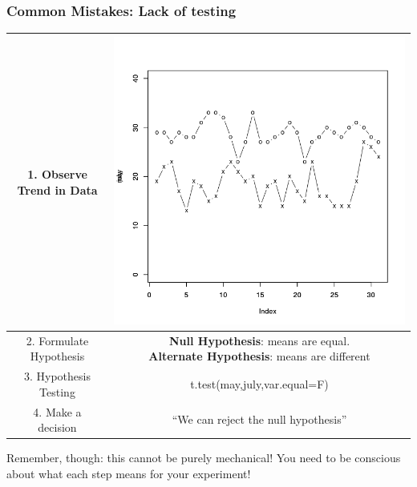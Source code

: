 \documentclass[10pt]{beamer}
\begin{document}
\begin{frame}
  \frametitle{Common Mistakes: Lack of testing}
  {\small
    
    \begin{center}
      {\renewcommand{\arraystretch}{2}
      \begin{tabular}{|c|c|}
        \hline
        1. Observe Trend in Data & \includegraphics[height=0.2\textheight]{img/yamamoto1}\\
        \hline
        2. Formulate Hypothesis & \makecell{{\bf Null Hypothesis}: means are equal.\\{\bf Alternate Hypothesis}: means are different}\\
        \hline
        3. Hypothesis Testing &  t.test(may,july,var.equal=F)\\
        \hline
        4. Make a decision & ``We can reject the null hypothesis''\\
        \hline
      \end{tabular}}
      
      \bigskip
      
      \begin{alertblock}{}
        Remember, though: this cannot be purely mechanical! You need
        to be conscious about what each step means for your
        experiment!
      \end{alertblock}
    \end{center}    
    }
\end{frame}
\end{document}
